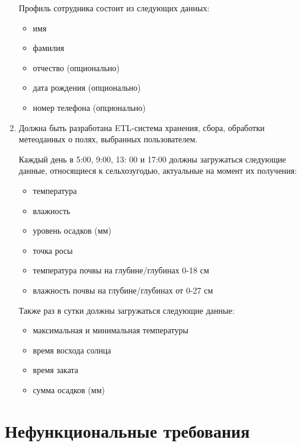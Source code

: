 \begin{enumerate}
            Профиль сотрудника состоит из следующих данных:
            \begin{itemize}
                \item имя
                \item фамилия
                \item отчество (опционально)
                \item дата рождения (опционально)
                \item номер телефона (опционально)
            \end{itemize}
            
        \item Должна быть разработана ETL-система хранения, сбора, обработки метеоданных о полях, выбранных пользователем.
        
            Каждый день в 5:00, 9:00, 13: 00 и 17:00 должны загружаться следующие данные, относящиеся к сельхозугодью, актуальные на момент их получения:
            \begin{itemize}
                \item температура
                \item влажность
                \item уровень осадков (мм)
                \item точка росы
                \item температура почвы на глубине/глубинах 0-18 см
                \item влажность почвы на глубине/глубинах от 0-27 см
            \end{itemize}
            
            Также раз в сутки должны загружаться следующие данные:
            \begin{itemize}
                \item максимальная и минимальная температуры
                \item время восхода солнца
                \item время заката
                \item сумма осадков (мм)
            \end{itemize}

            
    \end{enumerate}
            
    
    
    \section{Нефункциональные требования} \label{non_functional}
    
